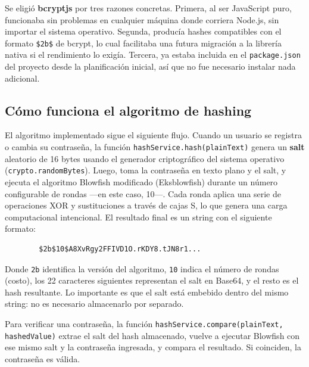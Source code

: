 \documentclass[journal]{IEEEtran}
\begin{document}
	Se eligi\'{o} \textbf{bcryptjs} por tres razones concretas.
	Primera, al ser JavaScript puro, funcionaba sin problemas en
	cualquier m\'{a}quina donde corriera Node.js, sin importar el
	sistema operativo. Segunda, produc\'{i}a hashes compatibles con
	el formato \texttt{\$2b\$} de bcrypt, lo cual facilitaba una
	futura migraci\'{o}n a la librer\'{i}a nativa si el rendimiento
	lo exig\'{i}a. Tercera, ya estaba incluida en el
	\texttt{package.json} del proyecto desde la planificaci\'{o}n
	inicial, as\'{i} que no fue necesario instalar nada adicional.
	
	\subsection{C\'{o}mo funciona el algoritmo de hashing}
	\label{subsec:algoritmo}
	
	El algoritmo implementado sigue el siguiente flujo. Cuando un
	usuario se registra o cambia su contrase\~{n}a, la
	funci\'{o}n \texttt{hashService.hash(plainText)} genera un
	\textbf{salt} aleatorio de 16 bytes usando el generador criptogr\'{a}fico
	del sistema operativo (\texttt{crypto.randomBytes}). Luego, toma
	la contrase\~{n}a en texto plano y el salt, y ejecuta el algoritmo
	Blowfish modificado (Eksblowfish) durante un n\'{u}mero
	configurable de rondas ---en este caso, 10---. Cada ronda
	aplica una serie de operaciones XOR y sustituciones a trav\'{e}s
	de cajas S, lo que genera una carga computacional intencional.
	El resultado final es un string con el siguiente formato:
	
	\begin{verbatim}
		$2b$10$A8XvRgy2FFIVD1O.rKDY8.tJN8r1...
	\end{verbatim}
	
	Donde \texttt{2b} identifica la versi\'{o}n del algoritmo,
	\texttt{10} indica el n\'{u}mero de rondas (costo), los 22
	caracteres siguientes representan el salt en Base64, y el
	resto es el hash resultante. Lo importante es que el salt
	est\'{a} embebido dentro del mismo string: no es necesario
	almacenarlo por separado.
	
	Para verificar una contrase\~{n}a, la funci\'{o}n
	\texttt{hashService.compare(plainText, hashedValue)} extrae el
	salt del hash almacenado, vuelve a ejecutar Blowfish con ese
	mismo salt y la contrase\~{n}a ingresada, y compara el resultado.
	Si coinciden, la contrase\~{n}a es v\'{a}lida.
	
\end{document}
